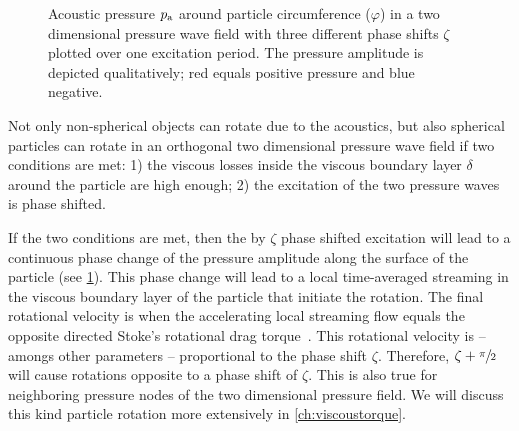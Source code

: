 \begin{figure}
\begin{subfigure}[b]{0.3\textwidth}
  \end{subfigure}
  \caption{Acoustic pressure $p_{\mathrm{a}}$ around particle circumference 
  ($\varphi$) in a two dimensional pressure wave field with three different 
phase shifts $\zeta$ plotted over one excitation period. The pressure amplitude 
is depicted qualitatively; red equals positive pressure and blue negative.}
  \label{fig:TA-VT}
 \end{figure}

Not only non-spherical objects can rotate due to the acoustics, but also 
spherical particles can rotate in an orthogonal two dimensional pressure wave 
field if two conditions are met: 1) the viscous losses inside the viscous 
boundary layer $\delta$ around the particle are high enough; 2) the excitation 
of the two pressure waves is phase shifted.

If the two conditions are met, then the by $\zeta$ phase shifted excitation 
will lead to a continuous phase change of the pressure amplitude along the 
surface of the particle (see \cref{fig:TA-VT}). This phase change will lead to 
a local time-averaged streaming in the viscous boundary layer of the particle 
that initiate the rotation. The final rotational velocity is when the 
accelerating local streaming flow equals the opposite directed Stoke's 
rotational drag torque~\cite{Lamprecht2017}. This rotational velocity is -- 
amongs other parameters -- proportional to the phase shift $\zeta$. Therefore, 
$\zeta + \sfrac{\pi}{2}$ will cause rotations opposite to a phase shift of 
$\zeta$. This is also true for neighboring pressure nodes of the two 
dimensional pressure field. We will discuss this kind particle rotation more 
extensively in \cref{ch:viscoustorque}.

